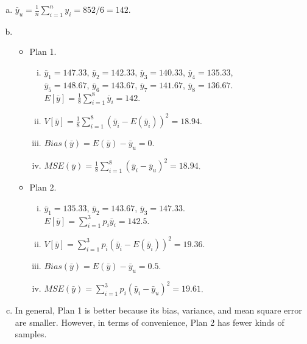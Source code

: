 \documentclass[12pt]{article}
\begin{document}
    \begin{solution}
        \begin{enumerate}[(a)]
            \item $\bar{y}_u=\frac{1}{n}\sum_{i=1}^n y_i=852/6=142. $
            \item 
            \begin{itemize}
                \item Plan 1. 
                \begin{enumerate}[(i)]
                    \item $\bar{y}_1=147.33$, $\bar{y}_2=142.33$, $\bar{y}_3=140.33$, $\bar{y}_4=135.33$, \\
                    $\bar{y}_5=148.67$, $\bar{y}_6=143.67$, $\bar{y}_7=141.67$, $\bar{y}_8=136.67$.\\
                    $E[\bar{y}]=\frac{1}{8}\sum_{i=1}^8\bar{y}_i=142$. 
                    \item $V[\bar{y}]=\frac{1}{8}\sum_{i=1}^8(\bar{y}_i-E(\bar{y}_i))^2=18.94$. 
                    \item $Bias(\bar{y})=E(\bar{y})-\bar{y}_u=0$. 
                    \item $MSE(\bar{y})=\frac{1}{8}\sum_{i=1}^8(\bar{y}_i-\bar{y}_u)^2=18.94$. 
                \end{enumerate}
                \item Plan 2.  
                \begin{enumerate}[(i)]
                    \item $\bar{y}_1=135.33$, $\bar{y}_2=143.67$, $\bar{y}_3=147.33$.\\
                    $E[\bar{y}]=\sum_{i=1}^3p_i\bar{y}_i=142.5$. 
                    \item $V[\bar{y}]=\sum_{i=1}^3p_i(\bar{y}_i-E(\bar{y}_i))^2=19.36$. 
                    \item $Bias(\bar{y})=E(\bar{y})-\bar{y}_u=0.5$. 
                    \item $MSE(\bar{y})=\sum_{i=1}^3p_i(\bar{y}_i-\bar{y}_u)^2=19.61$. 
                \end{enumerate}
            \end{itemize}
            \item In general, Plan 1 is better because its bias, variance, and mean square error are smaller. However, in terms of convenience, Plan 2 has fewer kinds of samples. 
        \end{enumerate}
        
    \end{solution}
\end{document}
